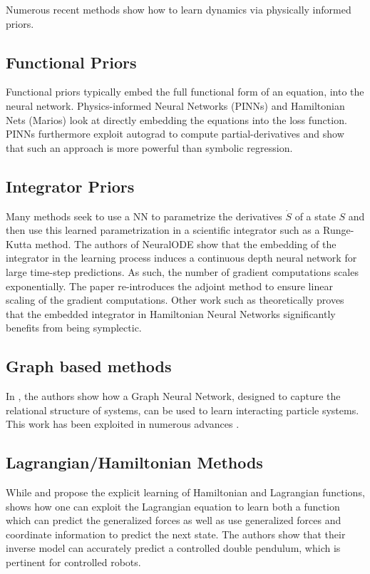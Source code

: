 \documentclass[twoside]{article}
\begin{document}
Numerous recent methods show how to learn dynamics via physically informed priors.
\subsection{Functional Priors}
Functional priors typically embed the full functional form of an equation, into the neural network. Physics-informed Neural Networks (PINNs) \cite{raissi_physics_2017,raissi_physics-informed_2019} and Hamiltonian Nets (Marios) look at directly embedding the equations into the loss function. PINNs furthermore exploit autograd to compute partial-derivatives and show that such an approach is more powerful than symbolic regression.

\subsection{Integrator Priors}
Many methods seek to use a NN to parametrize the derivatives $\dot{S}$ of a state $S$ and then use this learned parametrization in a scientific integrator such as a Runge-Kutta method. The authors of NeuralODE \cite{chen_neural_2018} show that the embedding of the integrator in the learning process induces a continuous depth neural network for large time-step predictions. As such, the number of gradient computations scales exponentially. The paper re-introduces the adjoint method to ensure linear scaling of the gradient computations. Other work such as \cite{zhu_deep_2020} theoretically proves that the embedded integrator in Hamiltonian Neural Networks significantly benefits from being symplectic. 

\subsection{Graph based methods}
In \cite{battaglia_interaction_2016}, the authors show how a Graph Neural Network, designed to capture the relational structure of systems, can be used to learn interacting particle systems. This work has been exploited in numerous advances \cite{sanchez-gonzalez_graph_2018,sanchez-gonzalez_learning_2020,cranmer_lagrangian_2020}.

\subsection{Lagrangian/Hamiltonian Methods}
While \cite{cranmer_lagrangian_2020} and \cite{greydanus_hamiltonian_2019} propose the explicit learning of Hamiltonian and Lagrangian functions, \cite{lutter_deep_2019} shows how one can exploit the Lagrangian equation to learn both a function which can predict the generalized forces as well as use generalized forces and coordinate information to predict the next state. The authors show that their inverse model can accurately predict a controlled double pendulum, which is pertinent for controlled robots.
\end{document}
